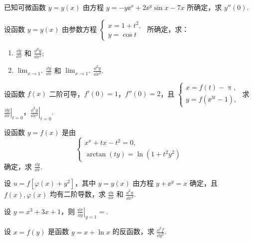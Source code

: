 	\begin{ti}
		已知可微函数 $y = y(x)$ 由方程 $y = - y\ee^{x} + 2\ee^{y} \sin x - 7x$ 所确定，求 $y''(0)$.
	\end{ti}

	\begin{ti}
		设函数 $y = y(x)$ 由参数方程 $\begin{cases}
			x = 1 + t^{2},\\
			y = \cos t
		\end{cases}$ 所确定，求：
		\begin{enumerate}
			\item $\frac{\dd{y}}{\dd{x}}$ 和 $\frac{\dd^{2}y}{\dd{x^{2}}}$;
			\item $\lim_{x \to 1^{+}} \frac{\dd{y}}{\dd{x}}$ 和 $\lim_{x \to 1^{+}} \frac{\dd^{2}y}{\dd{x^{2}}}$.
		\end{enumerate}
	\end{ti}

	\begin{ti}
		设函数 $f(x)$ 二阶可导，$f'(0) = 1$，$f''(0) = 2$，且 $\begin{cases}
			x = f(t) - \uppi,\\
			y = f\left( \ee^{3t} - 1 \right),
		\end{cases}$ 求 $\left. \frac{\dd{y}}{\dd{x}} \right|_{t = 0}$，$\left. \frac{\dd^{2}y}{\dd{x^{2}}} \right|_{t = 0}$.
	\end{ti}

	\begin{ti}
		设函数 $y = f(x)$ 是由
		\[
			\begin{cases}
				x^{x} + tx - t^{2} = 0,\\
				\arctan(ty) = \ln\left( 1 + t^{2}y^{2} \right)
			\end{cases}
		\]
		确定，求 $\frac{\dd{y}}{\dd{x}}$.
	\end{ti}

	\begin{ti}
		设 $u = f\left[ \varphi(x) + y^{2} \right]$，其中 $y = y(x)$ 由方程 $y + \ee^{y} = x$ 确定，且 $f(x), \varphi(x)$ 均有二阶导数，求 $\frac{\dd{u}}{\dd{x}}$ 和 $\frac{\dd^{2}u}{\dd{x^{2}}}$.
	\end{ti}

	\begin{ti}
		设 $y = x^{3} + 3x + 1$，则 $\left. \frac{\dd{x}}{\dd{y}} \right|_{y = 1}=$.
	\end{ti}

	\begin{ti}
		设 $x = f(y)$ 是函数 $y = x + \ln x$ 的反函数，求 $\frac{\dd^{2}f}{\dd{y^{2}}}$.
	\end{ti}

